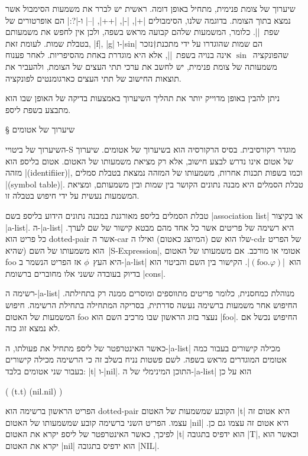\documentclass[a4paper,12pt,reqno]{article}
\begin{document}
שיערוך של צומת פנימית, מתחיל באופן דומה. ראשית יש לברר את משמעות הסימבול אשר
נמצא בתוך הצומת. בדוגמה שלנו, הסימבולים \T|+|, \T|-|, \T|++|, \T|--| ו-\T|?:|
הם אופרטורים של שפת~\E|\CPL|. כלומר, המשמעות שלהם קבועה מראש בשפה, ולכן אין לחפש את
משמעותם בטבלת שמות. לעומת זאת, \T|f|, \T|g| ו-\T|sin| הם שמות שהוגדרו על ידי
מתכנת†{נזכר שהפונקציה~$\sin$ אינה בנויה בשפת~\E|\CPL|, אלא היא מוגדרת באחת
מהסיפריות.} לאחר פענוח משמעותה של צומת פנימית, יש לחשב את ערכי תתי העצים של
הצומת, ולהעביר את תוצאות החישוב של תתי העצים כארגומנטים לפונקציה.

ניתן להבין באופן מדוייק יותר את תהליך השיערוך באמצעות בדיקה של האופן שבו הוא
מתבצע בשפת ליספ.

§ שיערוך של אטומים

השיערוך של ביטויי-S מוגדר רקורסיבית. בסיס הרקורסיה הוא בשיערוך של אטומים.
שיערוך של אטום אינו נדרש לבצע חישוב, אלא רק מציאת משמעותו של האטום. אטום בליספ
הוא מזהה \E|(identifiier)|, וכמו בשפות תכנות אחרות, משמעותו של המזהה נמצאת
בטבלת סמלים \E|(symbol table)|. טבלת הסמלים היא מבנה נתונים הקושר בין שמות
ובין משמעותם, ומציאת המשמעות נעשית על ידי חיפוש בטבלה זו.

טבלת הסמלים בליספ מאורגנת במבנה נתונים הידוע בליספ בשם \E|association list| או
בקיצור \E|a-list|. ה-\E|a-list| היא רשימה של פריטים אשר כל אחד מהם מבטא קישור
של שם לערך. כל פריט הוא dotted-pair אשר ה-car שלו הוא שם
(המיוצג כאטום) ואילו ה-cdr של הפריט הוא משמעותו של השם (שהיא~\E|S-Expression|,
אטומי או מורכב. אם משמעותו של האטום foo היא העץ~$ϕ$ אז הפריט הנשמר ב-\E|a-list|
הוא~\E|$(\text{foo}.φ)$|. הקישור בין השם והביטוי הוא בדיוק בעובדה ששני אלו מחוברים
ברשומת \E|cons|.

רשימה ה-\E|a-list| מנוהלת כמחסנית, כלומר פריטים מתווספים ומוסרים ממנה רק
בתחילתה. החיפוש אחר משמעות ברשימה נעשה סדרתית, בסריקה המתחילה בתחילת הרשימה.
חיפוש המשמעות של האטום foo נעצר בזוג הראשון שבו מרכיב השם הוא \E|foo|. החיפוש
נכשל אם לא נמצא זוג כזה.

כאשר האינטרפטר של ליספ מתחיל את פעולתו, ה-\E|a-list| מכילה קישורים בעבור כמה
אטומים המוגדרים מראש בשפה. לשם פשטות נניח בשלב זה כי הרשימה מכילה קישורים בעבור
שני אטומים בלבד: \E|t| ו-\E|nil|.
התוכן המינימלי של ה-\E|a-list| הוא על כן
\begin{LISP}
(
  (t.t)
  (nil.nil)
)
\end{LISP}

הפריט הראשון ברשימה הוא dotted-pair הקובע שמשמעות של האטום \T|t| היא אטום זה
עצמו. הפריט השני ברשימה קובע שמשמעותו של האטום \T|nil| היא אטום זה עצמו גם כן.
לפיכך, כאשר האינטרפטר של ליספ יקרא את האטום \T|t| הוא ידפיס בתגובה \T|T|, וכאשר
הוא יקרא את האטום \T|nil| הוא ידפיס בתגובה \T|NIL|.
\end{document}
